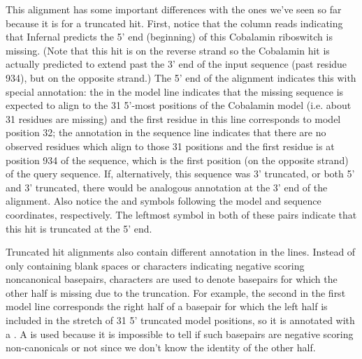 This alignment has some important differences with the ones we've seen
so far because it is for a truncated hit. First, notice that the
 column reads  indicating that Infernal
predicts the 5' end (beginning) of this Cobalamin riboswitch is
missing. (Note that this hit is on the reverse strand so the Cobalamin
hit is actually predicted to extend past the 3' end of the input
sequence (past residue 934), but on the opposite strand.) The 5' end
of the alignment indicates this with special annotation: the
\otext{<[31]*} in the model line indicates that the missing sequence
is expected to align to the 31 5'-most positions of the Cobalamin
model (i.e. about 31 residues are missing) and the first 
residue in this line corresponds to model position 32; the
\otext{<[0]*} annotation in the sequence line indicates that there are
no observed residues which align to those 31 positions and the first
 residue is at position 934 of the sequence, which is the
first position (on the opposite strand) of the query sequence. If,
alternatively, this sequence was 3' truncated, or both 5' and 3'
truncated, there would be analogous annotation at the 3' end of the
alignment. Also notice the \otext{~]} and  symbols following
the model and sequence coordinates, respectively. The \otext{~}
leftmost symbol in both of these pairs indicate that this hit is
truncated at the 5' end. 

Truncated hit alignments also contain different annotation in the
 lines. Instead of only containing blank spaces or 
characters indicating negative scoring noncanonical basepairs,
 characters are used to denote basepairs for which the other
half is missing due to the truncation. For example, the second
 in the first model line corresponds the right half of a
basepair for which the left half is included in the stretch of 31 5'
truncated model positions, so it is annotated with a .  A
 is used because it is impossible to tell if such basepairs
are negative scoring non-canonicals or not since we don't know the
identity of the other half.

